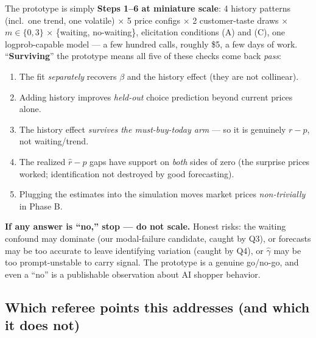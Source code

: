 \documentclass[11pt]{article}
\newcommand{\crit}[1]{\textcolor{crit}{\textbf{#1}}}
\begin{document}
The prototype is simply \textbf{Steps 1--6 at miniature scale}: 4 history patterns (incl.\ one trend, one
volatile) $\times$ 5 price configs $\times$ 2 customer-taste draws $\times$ $m\in\{0,3\}$ $\times$
\{waiting, no-waiting\}, elicitation conditions (A) and (C), one logprob-capable model --- a few hundred
calls, roughly \$5, a few days of work. ``\textbf{Surviving}'' the prototype means all five of these checks
come back \emph{pass}:
\begin{enumerate}[label=\textbf{Q\arabic*.}]
  \item The fit \emph{separately} recovers $\beta$ and the history effect (they are not collinear).
  \item Adding history improves \emph{held-out} choice prediction beyond current prices alone.
  \item The history effect \emph{survives the must-buy-today arm} --- so it is genuinely $r-p$, not
        waiting/trend.
  \item The realized $\hat r-p$ gaps have support on \emph{both} sides of zero (the surprise prices worked;
        identification not destroyed by good forecasting).
  \item Plugging the estimates into the simulation moves market prices \emph{non-trivially} in Phase B.
\end{enumerate}
\crit{If any answer is ``no,'' stop --- do not scale.} Honest risks: the waiting confound may dominate
(our modal-failure candidate, caught by Q3), or forecasts may be too accurate to leave identifying
variation (caught by Q4), or $\hat\gamma$ may be too prompt-unstable to carry signal. The prototype is a
genuine go/no-go, and even a ``no'' is a publishable observation about AI shopper behavior.

\subsection*{Which referee points this addresses (and which it does not)}
\end{document}
